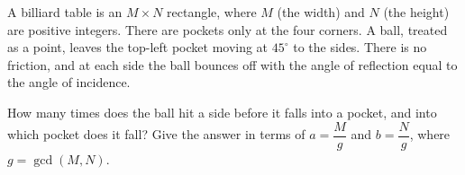 A billiard table is an $M\times N$ rectangle, where $M$ (the width) and $N$ (the height) are positive integers. There are pockets only at the four corners. A ball, treated as a point, leaves the top-left pocket moving at $45^\circ$ to the sides. There is no friction, and at each side the ball bounces off with the angle of reflection equal to the angle of incidence.

How many times does the ball hit a side before it falls into a pocket, and into which pocket does it fall? Give the answer in terms of $a=\dfrac{M}{g}$ and $b=\dfrac{N}{g}$, where $g=\gcd(M,N)$.
